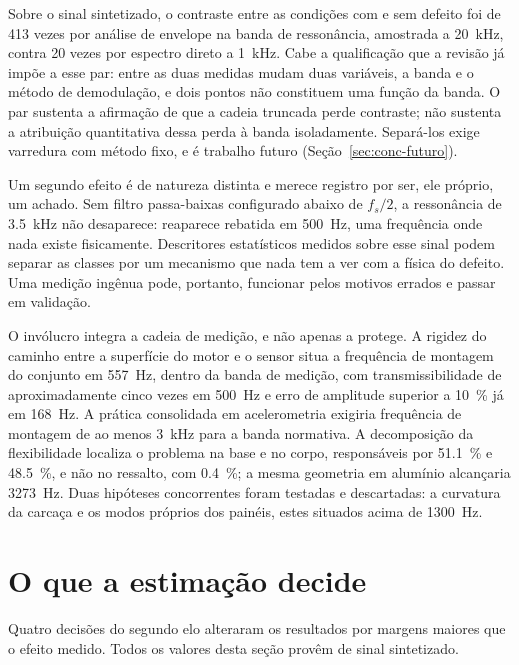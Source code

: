 Sobre o sinal sintetizado, o contraste entre as condições com e sem defeito foi de
\num{413} vezes por análise de envelope na banda de ressonância, amostrada a
\SI{20}{\kilo\hertz}, contra \num{20} vezes por espectro direto a \SI{1}{\kilo\hertz}.
Cabe a qualificação que a revisão já impõe a esse par: entre as duas medidas mudam duas
variáveis, a banda e o método de demodulação, e dois pontos não constituem uma função da
banda. O par sustenta a afirmação de que a cadeia truncada perde contraste; não sustenta a
atribuição quantitativa dessa perda à banda isoladamente. Separá-los exige varredura com
método fixo, e é trabalho futuro (Seção~\ref{sec:conc-futuro}).

Um segundo efeito é de natureza distinta e merece registro por ser, ele próprio, um
achado. Sem filtro passa-baixas configurado abaixo de $f_s/2$, a ressonância de
\SI{3,5}{\kilo\hertz} não desaparece: reaparece rebatida em \SI{500}{\hertz}, uma
frequência onde nada existe fisicamente. Descritores estatísticos medidos sobre esse sinal
podem separar as classes por um mecanismo que nada tem a ver com a física do defeito. Uma
medição ingênua pode, portanto, funcionar pelos motivos errados e passar em validação.

O invólucro integra a cadeia de medição, e não apenas a protege. A rigidez do caminho entre
a superfície do motor e o sensor situa a frequência de montagem do conjunto em
\SI{557}{\hertz}, dentro da banda de medição, com transmissibilidade de aproximadamente
cinco vezes em \SI{500}{\hertz} e erro de amplitude superior a \SI{10}{\percent} já em
\SI{168}{\hertz}. A prática consolidada em acelerometria exigiria frequência de montagem de
ao menos \SI{3}{\kilo\hertz} para a banda normativa. A decomposição da flexibilidade
localiza o problema na base e no corpo, responsáveis por \SI{51,1}{\percent} e
\SI{48,5}{\percent}, e não no ressalto, com \SI{0,4}{\percent}; a mesma geometria em
alumínio alcançaria \SI{3273}{\hertz}. Duas hipóteses concorrentes foram testadas e
descartadas: a curvatura da carcaça e os modos próprios dos painéis, estes situados acima
de \SI{1300}{\hertz}.

\section{O que a estimação decide}
\label{sec:conc-estimacao}

Quatro decisões do segundo elo alteraram os resultados por margens maiores que o efeito
medido. Todos os valores desta seção provêm de sinal sintetizado.


